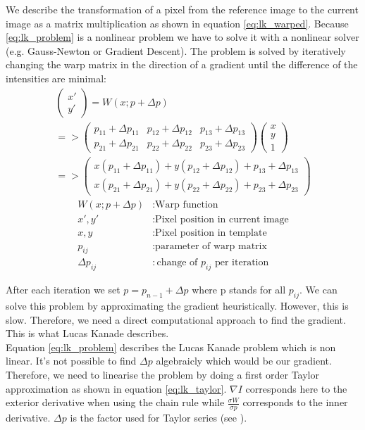 \documentclass[11pt,a4paper,titlepage,oneside]{report}
\begin{document}
We describe the transformation of a pixel from the reference image to the current image as a matrix multiplication as shown in equation \ref{eq:lk_warped}. Because \ref{eq:lk_problem} is a nonlinear problem we have to solve it with a nonlinear solver (e.g. Gauss-Newton or Gradient Descent). The problem is solved by iteratively changing the warp matrix in the direction of a gradient until the difference of the intensities are minimal:
\begin{equation}\label{eq:lk_warped}
  \begin{gathered}
    \begin{pmatrix}
      x' \\
      y'
    \end{pmatrix}=
    W(x;p+\Delta p)\\
    =>
    \begin{pmatrix}
      p_{11}+\Delta p_{11} & p_{12}+\Delta p_{12} & p_{13}+\Delta p_{13} \\
      p_{21}+\Delta p_{21} & p_{22}+\Delta p_{22} & p_{23}+\Delta p_{23}
    \end{pmatrix}
    \begin{pmatrix}
      x\\
      y\\
      1
    \end{pmatrix}\\
    =>
    \begin{pmatrix}
      x(p_{11}+\Delta p_{11}) + y(p_{12}+\Delta p_{12}) + p_{13}+\Delta p_{13} \\
      x(p_{21}+\Delta p_{21}) + y(p_{22}+\Delta p_{22}) + p_{23}+\Delta p_{23}
    \end{pmatrix}
  \end{gathered}
\end{equation}
\begin{align*}
  W(x;p+\Delta p)  &:  \text{Warp function}\\
  x',y'            &:  \text{Pixel position in current image}\\
  x,y              &:  \text{Pixel position in template}\\
  p_{ij}          &:  \text{parameter of warp matrix}\\
  \Delta p_{ij}    &:  \text{change of $p_{ij}$ per iteration}
\end{align*}

After each iteration we set $p=p_{n-1}+\Delta p$ where p stands for all $p_{ij}$. We can solve this problem by approximating the gradient heuristically. However, this is slow. Therefore, we need a direct computational approach to find the gradient. This is what Lucas Kanade describes. \\
Equation \ref{eq:lk_problem} describes the Lucas Kanade problem which is non linear. It's not possible to find $\Delta p$ algebraicly which would be our gradient. Therefore, we need to linearise the problem by doing a first order Taylor approximation as shown in equation \ref{eq:lk_taylor}. $\nabla I$ corresponds here to the exterior derivative when using the chain rule while $\frac{\sigma W}{\sigma p}$ corresponds to the inner derivative. $\Delta p$ is the factor used for Taylor series (see \cite{taylor_series}).
\end{document}
